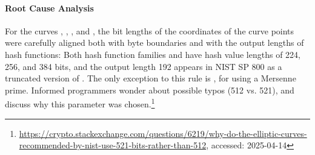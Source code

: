 \paragraph{Root Cause Analysis}

For the curves \poneninetwo, \ptwotwofour, \ptwofivesix, and \pthreeeightfour, the bit lengths of the coordinates of the curve points were carefully aligned both with byte boundaries and with the output lengths of hash functions: Both hash function families \shatwo and \shathree have hash value lengths of 224, 256, and 384 bits, and the output length 192 appears in NIST SP 800 as a truncated version of \shatwofivesix. The only exception to this rule is \pfivetwoone, for using a Mersenne prime. Informed programmers wonder about possible typos (512 vs. 521), and discuss why this parameter was chosen.\footnote{\url{https://crypto.stackexchange.com/questions/6219/why-do-the-elliptic-curves-recommended-by-nist-use-521-bits-rather-than-512}, accessed: 2025-04-14}
